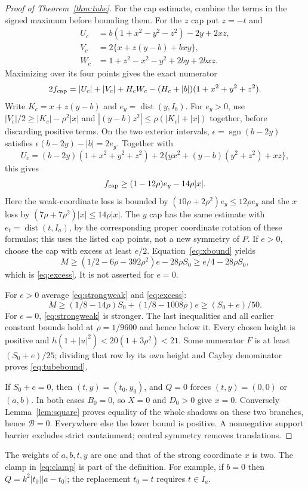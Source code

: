 \documentclass[11pt]{amsart}
\theoremstyle{definition}
\theoremstyle{remark}
\begin{document}
\begin{proof}[Proof of Theorem~\ref{thm:tube}]
For the cap estimate, combine the terms in the signed maximum before
bounding them. For the $z$ cap put $z=-t$ and
\begin{align*}
 U_c&=b(1+x^2-y^2-z^2)-2y+2xz,\\
 V_c&=2\{x+z(y-b)+bxy\},\\
 W_c&=1+z^2-x^2-y^2+2by+2bxz.
\end{align*}
Maximizing over its four points gives the exact numerator
\[
 2f_{\rm cap}=|U_c|+|V_c|+H_cW_c
                  -(H_c+|b|)(1+x^2+y^2+z^2).
\]
Write $K_c=x+z(y-b)$ and $e_y=\operatorname{dist}(y,I_b)$.
For $e_y>0$, use $|V_c|/2\ge|K_c|-\rho^2|x|$ and
$|(y-b)z^2|\le\rho(|K_c|+|x|)$ together, before discarding positive
terms. On the two exterior intervals,
$\epsilon=\operatorname{sgn}(b-2y)$ satisfies
$\epsilon(b-2y)-|b|=2e_y$. Together with
\[
 U_c=(b-2y)(1+x^2+y^2+z^2)
          +2\{yx^2+(y-b)(y^2+z^2)+xz\},
\]
this gives
\[
 f_{\rm cap}\ge(1-12\rho)e_y-14\rho|x|.
\]
Here the weak-coordinate loss is bounded by
$(10\rho+2\rho^2)e_y\le12\rho e_y$ and the $x$ loss by
$(7\rho+7\rho^2)|x|\le14\rho|x|$.
The $y$ cap has the same estimate with
$e_t=\operatorname{dist}(t,I_a)$, by the corresponding proper coordinate
rotation of these formulas; this uses the listed cap points, not a new
symmetry of $P$. If $e>0$, choose the cap with excess at least $e/2$.
Equation~\eqref{eq:xbound} yields
\[
 M\ge(1/2-6\rho-392\rho^2)e-28\rho S_0
                       \ge e/4-28\rho S_0,
\]
which is \eqref{eq:excess}. It is not asserted for $e=0$.

For $e>0$ average \eqref{eq:strongweak} and \eqref{eq:excess}:
\[
 M\ge(1/8-14\rho)S_0+(1/8-1008\rho)e
                           \ge(S_0+e)/50.
\]
For $e=0$, \eqref{eq:strongweak} is stronger. The last inequalities and
all earlier constant bounds hold at $\rho=1/9600$ and hence below it.
Every chosen height is positive and
$h(1+|u|^2)<20(1+3\rho^2)<21$.
Some numerator $F$ is at least $(S_0+e)/25$; dividing that row by its
own height and Cayley denominator proves \eqref{eq:tubebound}.

If $S_0+e=0$, then $(t,y)=(t_0,y_0)$, and $Q=0$ forces
$(t,y)=(0,0)$ or $(a,b)$. In both cases $B_0=0$, so $X=0$ and $D_0>0$
give $x=0$. Conversely Lemma~\ref{lem:square} proves equality of the
whole shadows on these two branches, hence $\mathcal B=0$. Everywhere
else the lower bound is positive. A nonnegative support barrier excludes
strict containment; central symmetry removes translations.
\end{proof}

The weights of $a,b,t,y$ are one and that of the strong
coordinate $x$ is two. The clamp in \eqref{eq:clamp} is part of the
definition. For example, if $b=0$ then
$Q=k^2|t_0||a-t_0|$; the replacement $t_0=t$ requires $t\in I_a$.
\end{document}
